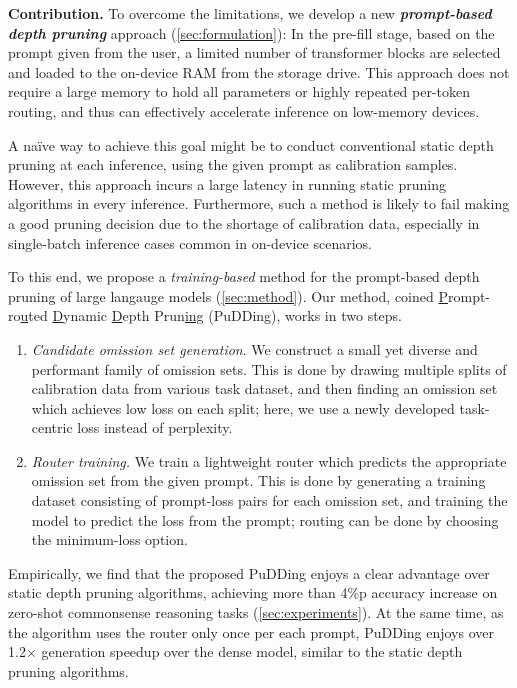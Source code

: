 \textbf{Contribution.} To overcome the limitations, we develop a new \textbf{\textit{prompt-based depth pruning}} approach (\cref{sec:formulation}): In the pre-fill stage, based on the prompt given from the user, a limited number of transformer blocks are selected and loaded to the on-device RAM from the storage drive. This approach does not require a large memory to hold all parameters or highly repeated per-token routing, and thus can effectively accelerate inference on low-memory devices.

A na\"{i}ve way to achieve this goal might be to conduct conventional static depth pruning at each inference, using the given prompt as calibration samples. However, this approach incurs a large latency in running static pruning algorithms in every inference. Furthermore, such a method is likely to fail making a good pruning decision due to the shortage of calibration data, especially in single-batch inference cases common in on-device scenarios.

To this end, we propose a \textit{training-based} method for the prompt-based depth pruning of large langauge models (\cref{sec:method}). Our method, coined \underline{P}rompt-ro\underline{u}ted \underline{D}ynamic \underline{D}epth Prun\underline{ing} (PuDDing), works in two steps. 
\begin{enumerate}[leftmargin=*,topsep=0pt,parsep=0pt,itemsep=1.5pt]
\item \textit{Candidate omission set generation}. We construct a small yet diverse and performant family of omission sets. This is done by drawing multiple splits of calibration data from various task dataset, and then finding an omission set which achieves low loss on each split; here, we use a newly developed task-centric loss instead of perplexity.
\item \textit{Router training.} We train a lightweight router which predicts the appropriate omission set from the given prompt. This is done by generating a training dataset consisting of prompt-loss pairs for each omission set, and training the model to predict the loss from the prompt; routing can be done by choosing the minimum-loss option.
\end{enumerate}

Empirically, we find that the proposed PuDDing enjoys a clear advantage over static depth pruning algorithms, achieving more than 4\%p accuracy increase on zero-shot commonsense reasoning tasks (\cref{sec:experiments}). At the same time, as the algorithm uses the router only once per each prompt, PuDDing enjoys over 1.2$\times$ generation speedup over the dense model, similar to the static depth pruning algorithms.

